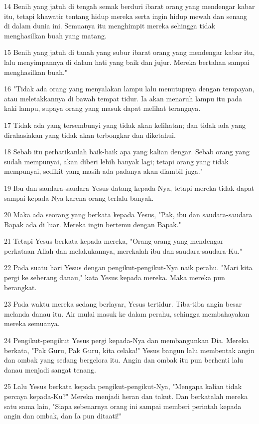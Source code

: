\par 14 Benih yang jatuh di tengah semak berduri ibarat orang yang mendengar kabar itu, tetapi khawatir tentang hidup mereka serta ingin hidup mewah dan senang di dalam dunia ini. Semuanya itu menghimpit mereka sehingga tidak menghasilkan buah yang matang.
\par 15 Benih yang jatuh di tanah yang subur ibarat orang yang mendengar kabar itu, lalu menyimpannya di dalam hati yang baik dan jujur. Mereka bertahan sampai menghasilkan buah."
\par 16 "Tidak ada orang yang menyalakan lampu lalu menutupnya dengan tempayan, atau meletakkannya di bawah tempat tidur. Ia akan menaruh lampu itu pada kaki lampu, supaya orang yang masuk dapat melihat terangnya.
\par 17 Tidak ada yang tersembunyi yang tidak akan kelihatan; dan tidak ada yang dirahasiakan yang tidak akan terbongkar dan diketahui.
\par 18 Sebab itu perhatikanlah baik-baik apa yang kalian dengar. Sebab orang yang sudah mempunyai, akan diberi lebih banyak lagi; tetapi orang yang tidak mempunyai, sedikit yang masih ada padanya akan diambil juga."
\par 19 Ibu dan saudara-saudara Yesus datang kepada-Nya, tetapi mereka tidak dapat sampai kepada-Nya karena orang terlalu banyak.
\par 20 Maka ada seorang yang berkata kepada Yesus, "Pak, ibu dan saudara-saudara Bapak ada di luar. Mereka ingin bertemu dengan Bapak."
\par 21 Tetapi Yesus berkata kepada mereka, "Orang-orang yang mendengar perkataan Allah dan melakukannya, merekalah ibu dan saudara-saudara-Ku."
\par 22 Pada suatu hari Yesus dengan pengikut-pengikut-Nya naik perahu. "Mari kita pergi ke seberang danau," kata Yesus kepada mereka. Maka mereka pun berangkat.
\par 23 Pada waktu mereka sedang berlayar, Yesus tertidur. Tiba-tiba angin besar melanda danau itu. Air mulai masuk ke dalam perahu, sehingga membahayakan mereka semuanya.
\par 24 Pengikut-pengikut Yesus pergi kepada-Nya dan membangunkan Dia. Mereka berkata, "Pak Guru, Pak Guru, kita celaka!" Yesus bangun lalu membentak angin dan ombak yang sedang bergelora itu. Angin dan ombak itu pun berhenti lalu danau menjadi sangat tenang.
\par 25 Lalu Yesus berkata kepada pengikut-pengikut-Nya, "Mengapa kalian tidak percaya kepada-Ku?" Mereka menjadi heran dan takut. Dan berkatalah mereka satu sama lain, "Siapa sebenarnya orang ini sampai memberi perintah kepada angin dan ombak, dan Ia pun ditaati!"
